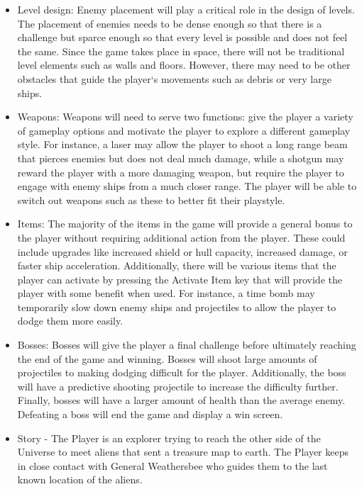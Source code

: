 \documentclass[12pt]{article}       %
\begin{document}
\begin{itemize}
\item Level design: Enemy placement will play a critical role in the design of levels. The placement of enemies needs to be dense enough so that there is a challenge but  sparce enough so that every level is possible and does not feel the same. Since the game takes place in space, there will not be traditional level elements such as walls and floors. However, there may need to be other obstacles that guide the player‘s movements such as debris or very large ships.

\item Weapons: Weapons will need to serve two functions: give the player a variety of gameplay options and motivate the player to explore a different gameplay style. For instance, a laser may allow the player to shoot a long range beam that pierces enemies but does not deal much damage, while a shotgun may reward the player with a more damaging weapon, but require the player to engage with enemy ships from a much closer range. The player will be able to switch out weapons such as these to better fit their playstyle.

\item Items: The majority of the items in the game will provide a general bonus to the player without requiring additional action from the player. These could include upgrades like increased shield or hull capacity, increased damage, or faster ship acceleration. Additionally, there will be various items that the player can activate by pressing the Activate Item key that will provide the player with some benefit when used. For instance, a time bomb may temporarily slow down enemy ships and projectiles to allow the player to dodge them more easily.

\item Bosses: Bosses will give the player a final challenge before ultimately reaching the end of the game and winning. Bosses will shoot large amounts of projectiles to making dodging difficult for the player. Additionally, the boss will have a predictive shooting projectile to increase the difficulty further. Finally, bosses will have a larger amount of health than the average enemy. Defeating a boss will end the game and display a win screen.

\item Story - The Player is an explorer trying to reach the other side of the Universe to meet aliens that sent a treasure map to earth. The Player keeps in close contact with General Weathersbee who guides them to the last known location of the aliens. 


\end{itemize}
\end{document}
